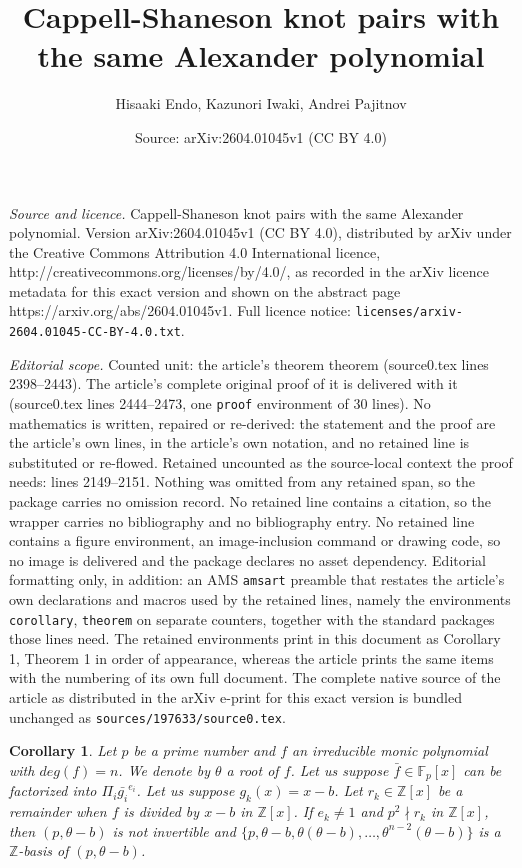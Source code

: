 \documentclass[10pt,a4paper]{amsart}
\title{Cappell-Shaneson knot pairs with the same Alexander polynomial}
\author{Hisaaki Endo, Kazunori Iwaki, Andrei Pajitnov}
\date{Source: arXiv:2604.01045v1 (CC BY 4.0)}
\newtheorem{corollary}{Corollary}
\begin{document}
\maketitle

\noindent\emph{Source and licence.} Cappell-Shaneson knot pairs with the same Alexander polynomial. Version arXiv:2604.01045v1 (CC BY 4.0), distributed by arXiv under the Creative Commons Attribution 4.0 International licence, http://creativecommons.org/licenses/by/4.0/, as recorded in the arXiv licence metadata for this exact version and shown on the abstract page https://arxiv.org/abs/2604.01045v1. Full licence notice: \texttt{licenses/arxiv-2604.01045-CC-BY-4.0.txt}.\par\smallskip

\noindent\textit{Editorial scope.} Counted unit: the article's theorem theorem (source0.tex lines 2398--2443). The article's complete original proof of it is delivered with it (source0.tex lines 2444--2473, one \texttt{proof} environment of 30 lines). No mathematics is written, repaired or re-derived: the statement and the proof are the article's own lines, in the article's own notation, and no retained line is substituted or re-flowed.  Retained uncounted as the source-local context the proof needs: lines 2149--2151.  Nothing was omitted from any retained span, so the package carries no omission record.  No retained line contains a citation, so the wrapper carries no bibliography and no bibliography entry.  No retained line contains a figure environment, an image-inclusion command or drawing code, so no image is delivered and the package declares no asset dependency.  Editorial formatting only, in addition: an AMS \texttt{amsart} preamble that restates the article's own declarations and macros used by the retained lines, namely the environments \texttt{corollary}, \texttt{theorem} on separate counters, together with the standard packages those lines need.  The retained environments print in this document as Corollary 1, Theorem 1 in order of appearance, whereas the article prints the same items with the numbering of its own full document.  The complete native source of the article as distributed in the arXiv e-print for this exact version is bundled unchanged as \texttt{sources/197633/source0.tex}.
    \begin{corollary}\label{corollary:sourceofinffamily}
    Let $p$ be a prime number and $f$ an irreducible monic polynomial with $deg(f) = n$. We denote by $\theta$ a root of $f$. Let us suppose $\bar{f} \in \mathbb{F}_p[x]$ can be factorized into $\Pi_i \bar{g_i}^{e_i}$. Let us suppose $g_k(x)=x-b$. Let $r_k \in \mathbb{Z}[x]$ be a remainder when $f$ is divided by $x - b$ in $\mathbb{Z}[x]$. If $e_k \neq 1$ and $p^2 \nmid r_k$ in $\mathbb{Z}[x]$, then $(p, \theta - b)$ is not invertible and $\{p, \theta - b, \theta ( \theta - b), \ldots , \theta^{n-2} (\theta - b)\}$ is a $\mathbb{Z}$-basis of $(p, \theta -b)$.
    \end{corollary}
\end{document}
